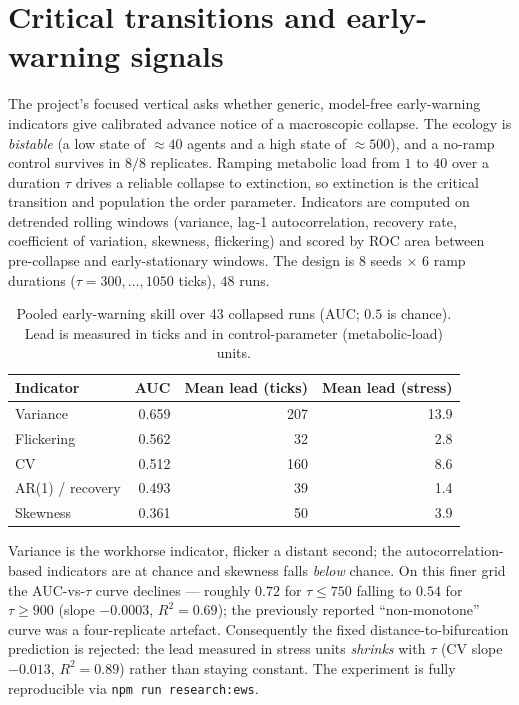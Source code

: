 \documentclass[11pt,a4paper]{article}
\begin{document}
\section{Critical transitions and early-warning signals}\label{sec:ews}
The project's focused vertical asks whether generic, model-free early-warning
indicators give calibrated advance notice of a macroscopic collapse. The
ecology is \emph{bistable} (a low state of $\approx 40$ agents and a high state
of $\approx 500$), and a no-ramp control survives in $8/8$ replicates. Ramping
metabolic load from $1$ to $40$ over a duration $\tau$ drives a reliable
collapse to extinction, so extinction is the critical transition and population
the order parameter. Indicators are computed on detrended rolling windows
(variance, lag-1 autocorrelation, recovery rate, coefficient of variation,
skewness, flickering) and scored by ROC area between pre-collapse and
early-stationary windows. The design is $8$ seeds $\times$ $6$ ramp durations
($\tau = 300,\dots,1050$ ticks), $48$ runs.

\begin{table}[t]\centering
\caption{Pooled early-warning skill over 43 collapsed runs (AUC; $0.5$ is
chance). Lead is measured in ticks and in control-parameter (metabolic-load)
units.}\label{tab:ews}
\begin{tabular}{l r r r}
\toprule
Indicator & AUC & Mean lead (ticks) & Mean lead (stress)\\
\midrule
Variance & 0.659 & 207 & 13.9\\
Flickering & 0.562 & 32 & 2.8\\
CV & 0.512 & 160 & 8.6\\
AR(1) / recovery & 0.493 & 39 & 1.4\\
Skewness & 0.361 & 50 & 3.9\\
\bottomrule
\end{tabular}
\end{table}

Variance is the workhorse indicator, flicker a distant second; the
autocorrelation-based indicators are at chance and skewness falls \emph{below}
chance. On this finer grid the AUC-vs-$\tau$ curve declines --- roughly $0.72$
for $\tau \le 750$ falling to $0.54$ for $\tau \ge 900$ (slope $-0.0003$,
$R^2 = 0.69$); the previously reported ``non-monotone'' curve was a
four-replicate artefact. Consequently the fixed distance-to-bifurcation
prediction is rejected: the lead measured in stress units \emph{shrinks} with
$\tau$ (CV slope $-0.013$, $R^2 = 0.89$) rather than staying constant. The
experiment is fully reproducible via \texttt{npm run research:ews}.
\end{document}
